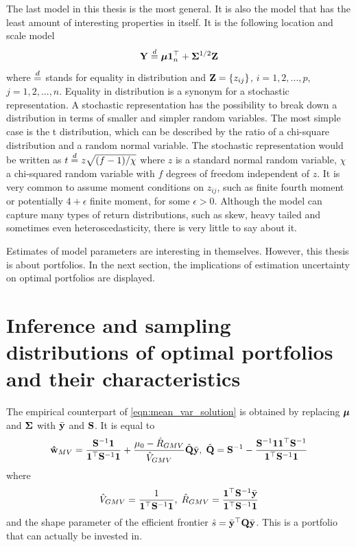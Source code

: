 \documentclass[12pt, twoside]{book}\usepackage{knitr}
\begin{document}
The last model in this thesis is the most general.
It is also the model that has the least amount of interesting properties in itself.
It is the following location and scale model
\begin{equation}\label{eqn:location_scale_model}
\mathbf{Y} \stackrel{d}{=} \mbox{\boldmath$\mu$} \mathbf{1}^\top_n + \mathbf{\Sigma}^{1/2} \mathbf{Z}
\end{equation}
where $\stackrel{d}{=}$ stands for equality in distribution  and $\mathbf{Z} = \{z_{ij}\}$, $i=1,2,...,p$, $j=1,2,...,n$.
Equality in distribution is a synonym for a stochastic representation.
A stochastic representation has the possibility to break down a distribution in terms of smaller and simpler random variables. 
The most simple case is the t distribution, which can be described by the ratio of a chi-square distribution and a random normal variable.
The stochastic representation would be written as $t \stackrel{d}{=} z \sqrt{(f-1)/\chi}$ where $z$ is a standard normal random variable, $\chi$ a chi-squared random variable with $f$ degrees of freedom independent of $z$.
It is very common to assume moment conditions on $z_{ij}$, such as finite fourth moment or potentially $4+\epsilon$ finite moment, for some $\epsilon>0$.
Although the model can capture many types of return distributions, such as skew, heavy tailed and sometimes even heteroscedasticity, there is very little to say about it.

Estimates of model parameters are interesting in themselves. 
However, this thesis is about portfolios.
In the next section, the implications of estimation uncertainty on optimal portfolios are displayed.

\section{Inference and sampling distributions of optimal portfolios and their characteristics}
The empirical counterpart of \eqref{eqn:mean_var_solution} is obtained by replacing $\mbox{\boldmath$\mu$}$ and $\mathbf{\Sigma}$ with $\bar{\mathbf{y}}$ and $\mathbf{S}$. It is equal to
\begin{equation}\label{eqn:meanvar_solution_sample}
	\mathbf{\hat{w}}_{MV} = \frac{\mathbf{S}^{-1}\mathbf{1}}{\mathbf{1}^\top \mathbf{S}^{-1}\mathbf{1}} + \frac{\mu_0 - \hat{R}_{GMV}}{\hat{V}_{GMV}} \hat{\mathbf{Q}} \bar{\mathbf{y}},\; \hat{\mathbf{Q}} = \mathbf{S}^{-1} - \frac{\mathbf{S}^{-1} \mathbf{1} \mathbf{1}^\top \mathbf{S}^{-1}}{\mathbf{1}^\top \mathbf{S}^{-1} \mathbf{1}}
\end{equation}
where 
\begin{equation}\label{eqn:meanvar_characteristics_sample}
  \hat{V}_{GMV} = \frac{1}{\mathbf{1}^\top \mathbf{S}^{-1}\mathbf{1}},\; \hat{R}_{GMV} = \frac{\mathbf{1}^\top \mathbf{S}^{-1} \bar{\mathbf{y}}}{\mathbf{1}^\top \mathbf{S}^{-1}\mathbf{1}}
\end{equation}
and the shape parameter of the efficient frontier $\hat{s} = \bar{\mathbf{y}}^\top \mathbf{Q} \bar{\mathbf{y}}$.
This is a portfolio that can actually be invested in. 
\end{document}
